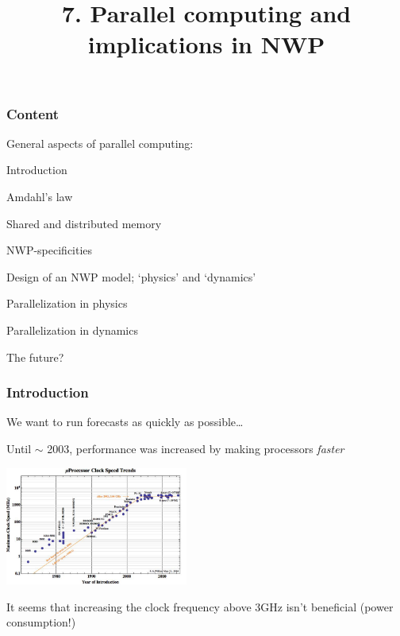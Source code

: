 \documentclass[aspectratio=43,9pt]{beamer}
\title{7. Parallel computing and implications in NWP}%
\begin{document}
%
%
\begin{frame}[plain]
	\titlepage
\end{frame}
%
%
\begin{frame}
	\frametitle{Content}
	\begin{myitemize}{4ex}
		\item General aspects of parallel computing:
			\begin{myitemize}{2ex}
				\item Introduction
				\item Amdahl's law
				\item Shared  and distributed memory
			\end{myitemize}
		\item NWP-specificities
			\begin{myitemize}{2ex}
				\item Design of an NWP model; `physics' and `dynamics'
				\item Parallelization in physics
				\item Parallelization in dynamics
				\item The future?
			\end{myitemize}
	\end{myitemize}
\end{frame}
%
%
\begin{frame}
	\frametitle{Introduction}
	\begin{myitemize}{2ex}
		\item We want to run forecasts as quickly as possible\ldots
		\item Until $\sim$ 2003, performance was increased by making processors \emph{faster}
			\begin{center}
				\includegraphics[width=6cm]{clocktrends}
			\end{center}
		\item It seems that increasing the clock frequency above 3GHz isn't beneficial (power consumption!)
	\end{myitemize}
\end{frame}
\end{document}
